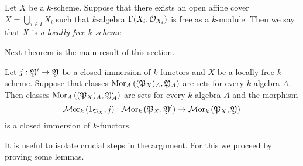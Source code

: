 \begin{definition}
Let $X$ be a $k$-scheme. Suppose that there exists an open affine cover $X = \bigcup_{i\in I}X_i$ such that $k$-algebra $\Gamma(X_i,{\mathcal O}_{X_i})$ is free as a $k$-module. Then we say that $X$ is \textit{a locally free $k$-scheme}.
\end{definition}
\noindent
Next theorem is the main result of this section.

\begin{theorem}\label{theorem:closedimmersionsandinternalhom}
Let $j:{\mathfrak Y}'\rightarrow {\mathfrak Y}$ be a closed immersion of $k$-functors and $X$ be a locally free $k$-scheme. Suppose that classes $\mathrm{Mor}_A\left(({\mathfrak P}_X)_A,{\mathfrak Y}_A\right)$ are sets for every $k$-algebra $A$. Then classes $\mathrm{Mor}_A\left(({\mathfrak P}_X)_A,{\mathfrak Y}'_A\right)$ are sets for every $k$-algebra $A$ and the morphism
$$\mathcal{M}\mathrm{or}_k\left(1_{{\mathfrak P}_X},j\right):\mathcal{M}\mathrm{or}_k\left({\mathfrak P}_X,{\mathfrak Y}'\right)\rightarrow \mathcal{M}\mathrm{or}_k\left({\mathfrak P}_X,{\mathfrak Y}\right)$$
is a closed immersion of $k$-functors.
\end{theorem}
\noindent
It is useful to isolate crucial steps in the argument. For this we proceed by proving some lemmas.

